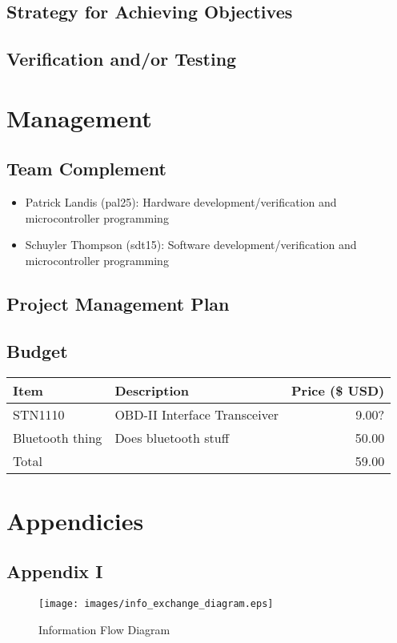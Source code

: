 \documentclass[12pt,letterpaper]{article}
\begin{document}
\subsection{Strategy for Achieving Objectives}

\subsection{Verification and/or Testing}

\section{Management}
\subsection{Team Complement}
\begin{itemize}
	\item Patrick Landis (pal25): Hardware development/verification and microcontroller programming

	\item Schuyler Thompson (sdt15): Software development/verification and microcontroller programming
\end{itemize}

\subsection{Project Management Plan}

\subsection{Budget}
\begin{tabular}{| l | p{10cm} | r |}
\hline
Item & Description & Price (\$ USD) \\ \hline
STN1110 & OBD-II Interface Transceiver & 9.00? \\ \hline
Bluetooth thing & Does bluetooth stuff & 50.00 \\ \hline
\hline
Total && 59.00 \\ \hline
\end{tabular}

\newpage

\section{Appendicies}
\subsection{Appendix I}
\begin{figure}[!ht]
\centering
\texttt{[image: images/info\_exchange\_diagram.eps]}
\caption{Information Flow Diagram}
\label{fig: image}
\end{figure}
\end{document}
